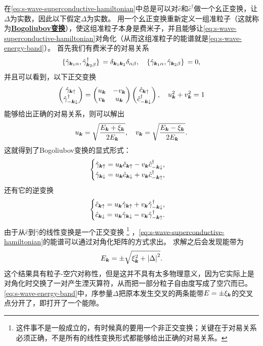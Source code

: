 \documentclass[hyperref, UTF8, a4paper]{ctexart}
\newcommand*{\concept}[1]{\underline{\textbf{#1}}}
\begin{document}
在\eqref{eq:s-wave-superconductive-hamiltonian}中总是可以对$\hat{c}$和$\hat{c}^\dagger$做一个幺正变换，让$\Delta$为实数，因此以下假定$\Delta$为实数。
用一个幺正变换重新定义一组准粒子（这就称为\concept{Bogoliubov变换}），使这组准粒子本身是费米子，并且能够让\eqref{eq:s-wave-superconductive-hamiltonian}对角化（从而这组准粒子的能谱就是\eqref{eq:s-wave-energy-band}）。
首先我们有费米子的对易关系
\[
    \acomm*{\hat{\gamma}_{\vb*{k}_1 \alpha}}{\hat{\gamma}^\dagger_{\vb*{k}_2 \beta}} = \delta_{\vb*{k}_1 \vb*{k}_2} \delta_{\alpha \beta}, \quad \acomm*{\hat{\gamma}_{\vb*{k}_1 \alpha}}{\hat{\gamma}_{\vb*{k}_2 \beta}} = 0,
\]
并且可以看到，以下正交变换
\[
    \pmqty{\hat{\gamma}_{\vb*{k} \uparrow} \\ \hat{\gamma}^\dagger_{-\vb*{k} \downarrow}} = \pmqty{u_{\vb*{k}} & -v_{\vb*{k}} \\ v_{\vb*{k}} & u_{\vb*{k}}} \pmqty{\hat{c}_{\vb*{k} \uparrow} \\ \hat{c}^\dagger_{-\vb*{k} \downarrow}},
    \quad u_{\vb*{k}}^2 + v_{\vb*{k}}^2 = 1
\]
能够给出正确的对易关系，则可以解出
\begin{equation}
    u_{\vb*{k}} = \sqrt{\frac{E_{\vb*{k}} + \xi_{\vb*{k}}}{2 E_{\vb*{k}}}}, \quad v_{\vb*{k}} = \sqrt{\frac{E_{\vb*{k}} - \xi_{\vb*{k}}}{2 E_{\vb*{k}}}}.
\end{equation}
这就得到了Bogoliubov变换的显式形式：
\begin{equation}
    \begin{cases}
        \hat{\gamma}_{\vb*{k} \uparrow} = u_{\vb*{k}} \hat{c}_{\vb*{k} \uparrow} - v_{\vb*{k}} \hat{c}_{-\vb*{k} \downarrow}^\dagger, \\
        \hat{\gamma}_{\vb*{k} \downarrow} = u_{\vb*{k}} \hat{c}_{\vb*{k} \downarrow} + v_{\vb*{k}} \hat{c}_{-\vb*{k} \uparrow}^\dagger,
    \end{cases}
    \label{eq:bogoliubov-transform}
\end{equation}
还有它的逆变换
\begin{equation}
    \begin{cases}
        \hat{c}_{\vb*{k} \uparrow} = u_{\vb*{k}} \hat{\gamma}_{\vb*{k} \uparrow} + v_{\vb*{k}} \hat{\gamma}_{-\vb*{k} \downarrow}^\dagger, \\
        \hat{c}_{\vb*{k} \downarrow} = u_{\vb*{k}} \hat{\gamma}_{\vb*{k} \downarrow} - v_{\vb*{k}} \hat{\gamma}_{-\vb*{k} \uparrow}^\dagger.
    \end{cases}
    \label{eq:inverse-bogoliubov-transform}
\end{equation}
由于从$\hat{c}$到$\hat{\gamma}$的线性变换是一个正交变换%
\footnote{这件事不是一般成立的，有时候真的要用一个非正交变换；关键在于对易关系必须正确，不是所有的线性变换形式都能够给出正确的对易关系。}%
，\eqref{eq:s-wave-superconductive-hamiltonian}的能谱可以通过对角化矩阵的方式求出。
求解之后会发现能带为
\begin{equation}
    E_{\vb*{k}} = \pm \sqrt{ \xi_{\vb*{k}}^2 + \abs{\Delta}^2 }.
    \label{eq:s-wave-energy-band}
\end{equation}
这个结果具有粒子-空穴对称性，但是这并不具有太多物理意义，因为它实际上是对角化时交换了一对产生湮灭算符，从而把一部分粒子自由度写成了空穴而已。
\eqref{eq:s-wave-energy-band}中，序参量$\Delta$把原本发生交叉的两条能带$E=\pm \xi_{\vb*{k}}$的交叉点分开了，即打开了一个能隙。
\end{document}
